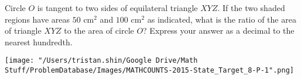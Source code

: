 Circle $O$ is tangent to two sides of equilateral triangle $XYZ$. If the two shaded regions have areas $50\text{ cm}^2$ and $100\text{ cm}^2$ as indicated, what is the ratio of the area of triangle $XYZ$ to the area of circle $O$? Express your answer as a decimal to the nearest hundredth.
\begin{center}
	\texttt{[image: "/Users/tristan.shin/Google Drive/Math Stuff/ProblemDatabase/Images/MATHCOUNTS-2015-State\_Target\_8-P-1".png]}
\end{center}